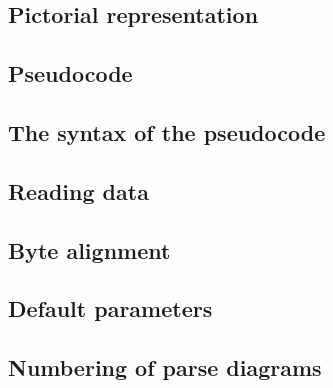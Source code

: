 

\subsection{Pictorial representation}
\subsection{Pseudocode}
\subsection{The syntax of the pseudocode}
\subsection{Reading data}
\subsection{Byte alignment}
\subsection{Default parameters}
\subsection{Numbering of parse diagrams}
